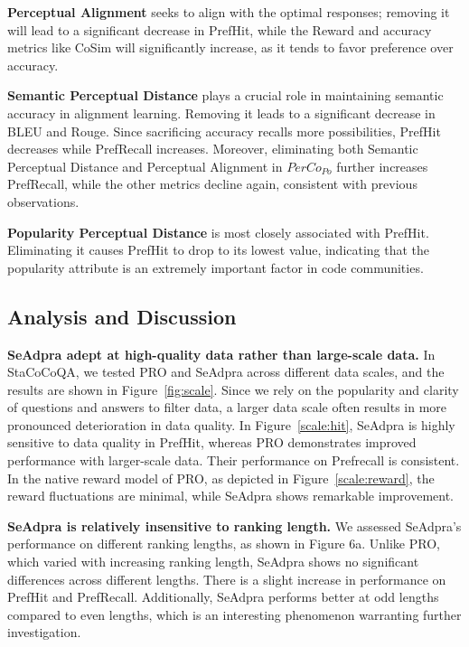 \textbf{Perceptual Alignment} seeks to align with the optimal responses; removing it will lead to a significant decrease in PrefHit, while the Reward and accuracy metrics like CoSim will significantly increase, as it tends to favor preference over accuracy.

\textbf{Semantic Perceptual Distance} plays a crucial role in maintaining semantic accuracy in alignment learning. Removing it leads to a significant decrease in BLEU and Rouge. Since sacrificing accuracy recalls more possibilities, PrefHit decreases while PrefRecall increases. Moreover, eliminating both Semantic Perceptual Distance and Perceptual Alignment in \(PerCo_{Po}\) further increases PrefRecall, while the other metrics decline again, consistent with previous observations.


\textbf{Popularity Perceptual Distance} is most closely associated with PrefHit. Eliminating it causes PrefHit to drop to its lowest value, indicating that the popularity attribute is an extremely important factor in code communities.



\subsection{Analysis and Discussion}

\textbf{SeAdpra adept at high-quality data rather than large-scale data.}
In StaCoCoQA, we tested PRO and SeAdpra across different data scales, and the results are shown in Figure~\ref{fig:scale}.
Since we rely on the popularity and clarity of questions and answers to filter data, a larger data scale often results in more pronounced deterioration in data quality. In Figure~\ref{scale:hit}, SeAdpra is highly sensitive to data quality in PrefHit, whereas PRO demonstrates improved performance with larger-scale data. Their performance on Prefrecall is consistent. In the native reward model of PRO, as depicted in Figure~\ref{scale:reward}, the reward fluctuations are minimal, while SeAdpra shows remarkable improvement.

\textbf{SeAdpra is relatively insensitive to ranking length.} 
We assessed SeAdpra's performance on different ranking lengths, as shown in Figure 6a. Unlike PRO, which varied with increasing ranking length, SeAdpra shows no significant differences across different lengths. There is a slight increase in performance on PrefHit and PrefRecall. Additionally, SeAdpra performs better at odd lengths compared to even lengths, which is an interesting phenomenon warranting further investigation.


